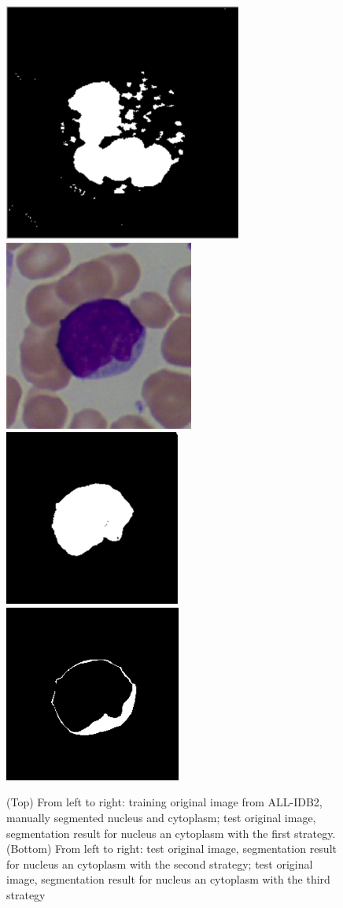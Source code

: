 \documentclass[final,a4paper,12pt,english]{UnicaPhdThesis3}
\begin{document}
\begin{figure}[!b]
		\includegraphics[height=0.10\textheight]{images/2015_1_caip/2-4}
		\includegraphics[height=0.10\textheight]{images/2015_1_caip/4-1}
		\includegraphics[height=0.10\textheight]{images/2015_1_caip/4-2}
		\includegraphics[height=0.10\textheight]{images/2015_1_caip/4-3}
		\caption{\label{fig:exs} (Top) From left to right: training original image from ALL-IDB2, manually segmented nucleus and cytoplasm; test original image, segmentation result for nucleus an cytoplasm with the first strategy. (Bottom) From left to right: test original image, segmentation result for nucleus an cytoplasm with the second strategy; test original image, segmentation result for nucleus an cytoplasm with the third strategy}
	\end{figure}
	
\end{document}
